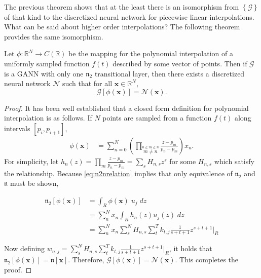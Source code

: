 The previous theorem shows that at the least there is an isomorphism from $\left\{\mathcal{G}\right\}$ of that kind to the discretized neural network for piecewise linear interpolations. What can be said about higher order interpolations? The following theorem provides the same isomorphism.

\begin{theorem}
	Let $\phi : \mathbb{R}^N \to C(\mathbb{R})$ be the mapping for the polynomial interpolation of a uniformly sampled function $f(t)$ described by some vector of points. Then if $\mathcal{G}$ is a GANN with only one $\mathfrak{n}_2$ transitional layer, then there exists a discretized neural network $\mathcal{N}$ such that for all $\pmb{x} \in \mathbb{R}^N$, 
	\begin{equation}
		\mathcal{G}\left[\phi(\pmb{x})\right] = \mathcal{N}(\pmb{x}).
	\end{equation}
\end{theorem}

\begin{proof}
	It has been well established that a closed form definition for polynomial interpolation is as follows. If $N$ points are sampled from a function $f(t)$ along intervals $[p_i,p_{i+1}],$
	\begin{equation} \label{eq:interpolate}
		\begin{aligned}
			\phi(\pmb{x}) 
			&=\sum_{n=0}^{N}\left ( \prod_{\stackrel{\!0\leq m\leq n}{m\neq n}}\frac{z-p_m}{p_n-p_m}\right ) x_n.
		\end{aligned}
	\end{equation}
	For simplicity, let $h_n(z) = \prod_m \frac{z-p_m}{p_n-p_m} = \sum_s H_{n,s} z^s$ for some $H_{n,s}$ which satisfy the relationship. Because \eqref{eq:n2nrelation} implies that only equivalence of $\mathfrak{n}_2$ and $\mathfrak{n}$ must be shown,

	\begin{equation}
		\begin{aligned}
			\mathfrak{n}_2[\phi(\pmb x)] &= \int_R\phi(\pmb{x})\;u_j\;dz \\ 
			 &= \sum_n^N x_n \int_R h_n(z)u_j(z)\;dz \\
			 &= \sum_n^N x_n \sum_{s}^N H_{n,s} \sum_t^T k_{t,j} \frac1{s+t+1}z^{s+t+1} \Big|_R
	      \end{aligned}
	\end{equation}

	Now defining $w_{n,j} =\sum_{s}^N H_{n,s} \sum_t^T k_{t,j} \frac1{s+t+1}z^{s+t+1} \big|_R$, it holds that $\mathfrak{n}_2[\phi(\pmb x)] = \mathfrak{n}[\pmb x].$ Therefore, $\mathcal{G}[\phi(\pmb x)] = \mathcal{N}(\pmb x).$ This completes the proof.

\end{proof}

